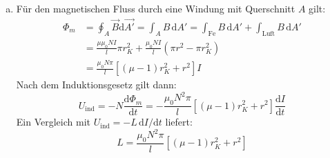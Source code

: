 \begin{enumerate}[(a)]
\item Für den magnetischen Fluss durch eine Windung mit Querschnitt $A$ gilt:
\begin{align}
\Phi_m &= \oint_A \vec{B}\mathrm{d}\vec{A'} = \int_A B \,\mathrm{d}A' = \int_\text{Fe} B \,\mathrm{d}A' + \int_\text{Luft} B \,\mathrm{d}A' \\
&= \frac{\mu\mu_0 N I }{l} \pi r_K^2 + \frac{\mu_0 N I}{l} (\pi r^2-\pi r_K^2)\\
&= \frac{\mu_0 N \pi}{l}\left[ (\mu-1) r_K^2 +r^2 \right] I
\end{align}
Nach dem Induktionsgesetz gilt dann:
\begin{equation}
U_\text{ind} = -N \frac{\mathrm{d}\Phi_m}{\mathrm{d}t} =- \frac{\mu_0 N^2 \pi}{l}\left[ (\mu-1) r_K^2 +r^2 \right] \frac{\mathrm{d}I}{\mathrm{d}t}
\end{equation}
Ein Vergleich mit $U_\text{ind}=-L \,\mathrm{d}I/\mathrm{d}t$ liefert:
\begin{equation}
L = \frac{\mu_0 N^2 \pi}{l}\left[ (\mu-1) r_K^2 +r^2 \right] 
\end{equation}

\end{enumerate}